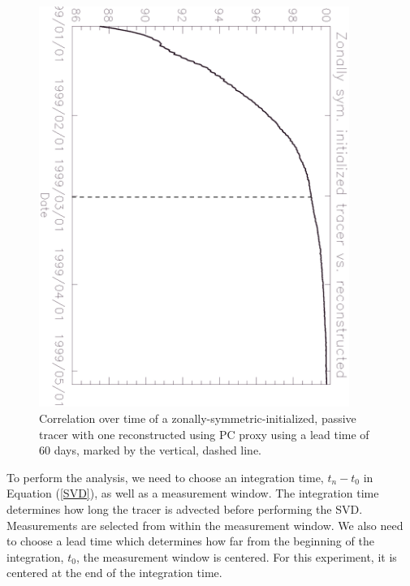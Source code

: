 \documentclass{article}
\begin{document}
\begin{figure}
\begin{center}
\includegraphics[angle=90, width=0.9\textwidth]{../pc_proxy/proxycorr.eps}
\caption{Correlation over time of a zonally-symmetric-initialized, passive tracer
with one reconstructed using PC proxy using a lead time of 60 days,
marked by the vertical, dashed line.}\label{PCproxytest}
\end{center}
\end{figure}

To perform the analysis, we need to choose an integration time, 
$t_n-t_0$ in Equation (\ref{SVD}), as well as a measurement window.
The integration time determines how long the tracer is advected before performing
the SVD.
Measurements are selected from within the measurement window.
We also need to choose a lead time which determines how far from the
beginning of the integration, $t_0$, the measurement window is centered.
For this experiment, it is centered at the end of the integration time.
\end{document}
